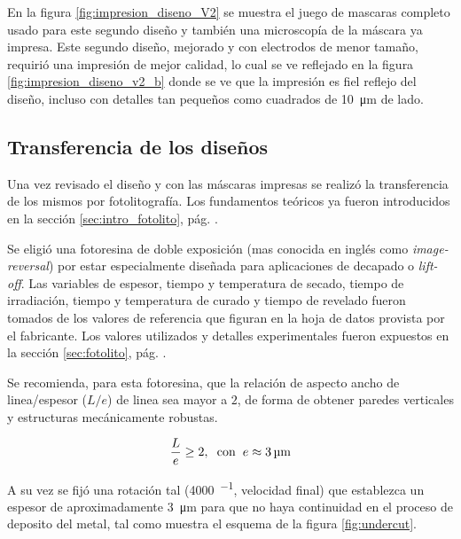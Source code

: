 {		 En la figura \ref{fig:impresion_diseno_V2} se muestra el juego de mascaras completo usado para este segundo diseño y también una microscopía de la máscara ya impresa. Este segundo diseño, mejorado y con electrodos de menor tamaño, requirió una impresión de mejor calidad, lo cual se ve reflejado en la figura \ref{fig:impresion_diseno_v2_b} donde se ve que la impresión es fiel reflejo del diseño, incluso con detalles tan pequeños como cuadrados de \SI{10}{\um} de lado. 
				
 		\subsection{Transferencia de los diseños}

 		 Una vez revisado el diseño y con las máscaras impresas se realizó la transferencia de los mismos por fotolitografía. Los fundamentos teóricos ya fueron introducidos en la sección \ref{sec:intro_fotolito}, pág. \pageref{sec:intro_fotolito}.

 		 Se eligió una fotoresina de doble exposición (mas conocida en inglés como \textit{image-reversal}) por estar especialmente diseñada  para aplicaciones de decapado o \textit{lift-off}. Las variables de espesor, tiempo y temperatura de secado, tiempo de irradiación, tiempo y temperatura de curado y tiempo de revelado fueron tomados de los valores de referencia que figuran en la hoja de datos provista por el fabricante. \cite{TI35E} Los valores utilizados y detalles experimentales fueron expuestos en la sección \ref{sec:fotolito}, pág. \pageref{sec:fotolito}.

 		 Se recomienda, para esta fotoresina, que la relación de aspecto ancho de linea/espesor ($L/e$) de linea sea mayor a $2$, de forma de obtener paredes verticales y estructuras mecánicamente robustas. 

 			\begin{equation}
				\frac{L}{e} \geq 2, \hspace*{0.2cm}\text{con}\hspace{0.2cm}  e \approx \SI{3}{\um}		
 			\end{equation}

 	    	A su vez se fijó una rotación tal (\SI{4000}{\min^{-1}}, velocidad final) que establezca un espesor de aproximadamente \SI{3}{\um} para que no haya continuidad en el proceso de deposito del metal, tal como muestra el esquema de la figura \ref{fig:undercut}.

}
